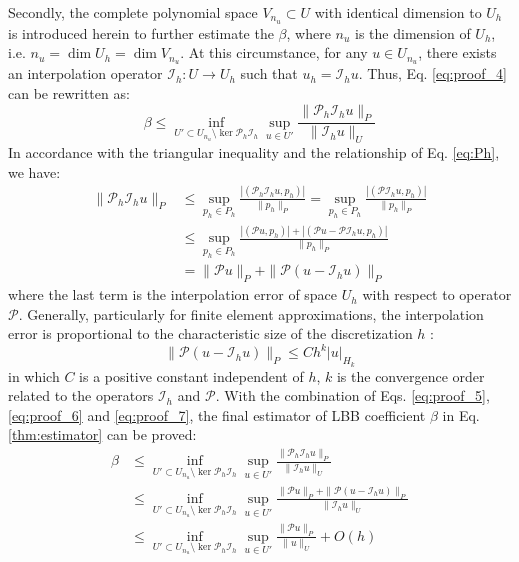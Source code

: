 \begin{pf}
Secondly, the complete polynomial space $V_{n_u} \subset U$ with identical dimension to $U_h$ is introduced herein to further estimate the $\beta$, where $n_u$ is the dimension of $U_h$, i.e. $n_u = \dim U_h = \dim V_{n_u}$.
At this circumstance, for any $u \in U_{n_u}$, there exists an interpolation operator $\mathcal I_h: U \to U_h$ such that $u_h = \mathcal I_h u$.
Thus, Eq. \eqref{eq:proof_4} can be rewritten as:
\begin{equation}\label{eq:proof_5}
    \beta \leq \inf_{U' \subset U_{n_u}\setminus \ker \mathcal P_h \mathcal I_h} \sup_{u \in U'} \frac{\| \mathcal P_h \mathcal I_h u \|_P}{\| \mathcal I_h u \|_U}
\end{equation}
In accordance with the triangular inequality \cite{brenner2008} and the relationship of Eq. \eqref{eq:Ph}, we have:
\begin{equation}\label{eq:proof_6}
    \begin{aligned}
        \| \mathcal P_h \mathcal I_h u \|_P & \leq \sup_{p_h \in P_h} \frac{|(\mathcal P_h \mathcal I_h u, p_h)|}{\| p_h \|_P} = \sup_{p_h \in P_h} \frac{|(\mathcal P \mathcal I_h u, p_h)|}{\| p_h \|_P} \\
        &\leq \sup_{p_h \in P_h} \frac{| (\mathcal P u, p_h) | + | (\mathcal P u - \mathcal P \mathcal I_h u, p_h) |}{\|p_h\|_P} \\
        &= \| \mathcal P u \|_P + \|\mathcal P (u - \mathcal I_h u)\|_P
    \end{aligned}
\end{equation}
where the last term is the interpolation error of space $U_h$ with respect to operator $\mathcal P$.
Generally, particularly for finite element approximations, the interpolation error is proportional to the characteristic size of the discretization $h$ \cite{brenner2008}:
\begin{equation}\label{eq:proof_7}
    \|\mathcal P (u - \mathcal I_h u)\|_P \leq C h^k |u|_{H_k}
\end{equation}
in which $C$ is a positive constant independent of $h$, $k$ is the convergence order related to the operators $\mathcal I_h$ and $\mathcal P$. With the combination of Eqs. \eqref{eq:proof_5}, \eqref{eq:proof_6} and \eqref{eq:proof_7}, the final estimator of LBB coefficient $\beta$ in Eq. \eqref{thm:estimator} can be proved:
\begin{equation}
    \begin{aligned}
    \beta &\leq \inf_{U' \subset U_{n_u}\setminus \ker \mathcal P_h \mathcal I_h} \sup_{u \in U'} \frac{\| \mathcal P_h \mathcal I_h u \|_P}{\| \mathcal I_h u \|_U} \\
    &\leq \inf_{U' \subset U_{n_u}\setminus \ker \mathcal P_h \mathcal I_h} \sup_{u \in U'} \frac{\| \mathcal P u \|_P + \| \mathcal P (u - \mathcal I_h u) \|_P}{\| \mathcal I_h u \|_U} \\
    &\leq \inf_{U' \subset U_{n_u}\setminus \ker \mathcal P_h \mathcal I_h} \sup_{u \in U'} \frac{\| \mathcal P u\|_P}{\| u \|_U} + O(h)
    \end{aligned}
\end{equation}
\end{pf}

